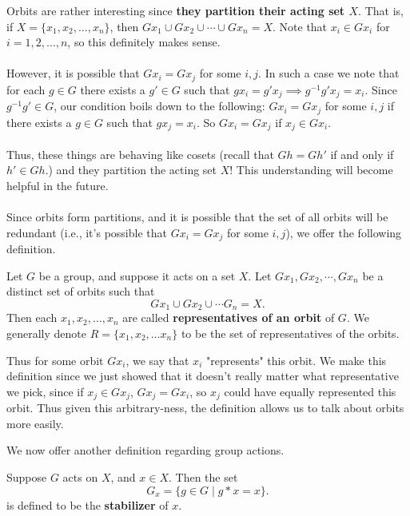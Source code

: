 \documentclass[12pt,letterpaper]{algebra_book}
\theoremstyle{definition}
\begin{document}
    \textcolor{NavyBlue}{Orbits are rather interesting since \textbf{they partition their acting
    set $X$}. That is, if $X = \{x_1, x_2, \dots, x_n\}$, then 
    $Gx_1 \cup Gx_2 \cup \cdots \cup Gx_n = X$. Note that $x_i \in
    Gx_i$ for $i = 1, 2, \dots, n$, so this definitely makes sense.
    \\
    \\
    However, it is possible that $Gx_i = Gx_j$ for some $i, j.$ In
    such a case we note that for each $g \in G$ there exists a $g' \in
    G$ such that $gx_i = g'x_j \implies g^{-1}g'x_j = x_i$. Since
    $g^{-1}g' \in G$, 
    our condition boils down to the following: 
    $Gx_i = Gx_j$ for some $i, j$ if there exists a $g \in G$
    such that 
    $gx_j = x_i$. So $Gx_i = Gx_j$ if $x_j \in Gx_i$.}
    \\
    \\
    Thus, these things are behaving like cosets (recall that $Gh =
    Gh'$ if and only if $h' \in Gh$.) and they partition the acting
    set $X$! This understanding will become helpful in the future. 
    \\
    \\
    Since orbits form partitions, and it is possible that the set of
    all orbits will be redundant (i.e., it's possible that $Gx_i =
    Gx_j$ for some $i, j$), we offer the following definition.

    \begin{definition}
        Let $G$ be a group, and suppose it acts on a set $X$. 
        Let $Gx_1, Gx_2, \cdots, Gx_n$ be a distinct set of
        orbits  such that 
        \[
            Gx_1 \cup Gx_2 \cup \cdots G_n = X.
        \]
        Then each $x_1, x_2, \dots, x_n$ are called
        \textbf{representatives of an orbit} of $G$. We generally
        denote $R = \{x_1, x_2, \dots x_n\}$ to be the set of
        representatives of the orbits. 
    \end{definition}

    Thus for some orbit $Gx_i$, we say that $x_i$ "represents" this
    orbit. We make this definition since we just showed that 
    it doesn't really matter what representative we pick, since if 
    $x_j \in Gx_j$, $Gx_j = Gx_i$, so $x_j$ could have equally
    represented this orbit. Thus given this arbitrary-ness, the
    definition allows us to talk about orbits more easily.
    
    We now offer another definition regarding group actions.

    \begin{definition}
        Suppose $G$ acts on $X$, and $x \in X$. Then the set 
        \[
            G_x = \{g \in G \mid g * x = x\}.
        \]
        is defined to be the \textbf{stabilizer} of $x$.
    \end{definition}
    
\end{document}
